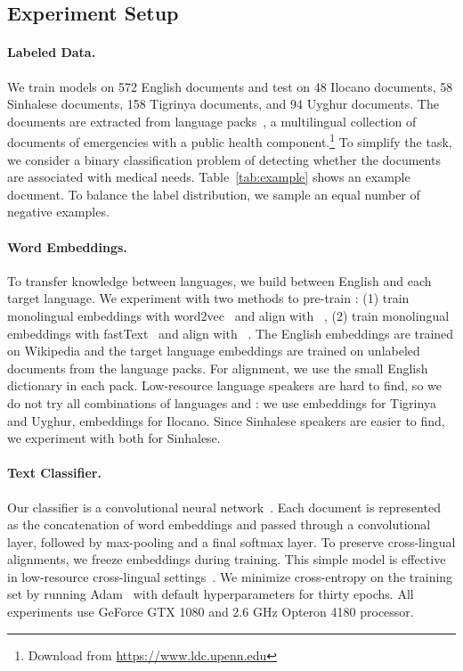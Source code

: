 \subsection{Experiment Setup}

\paragraph{Labeled Data.}
We train models on 572 English documents and test on 48 Ilocano documents, 58
Sinhalese documents, 158 Tigrinya documents, and 94 Uyghur documents.
The documents are extracted from  language
packs~\citep{strassel-16}, a multilingual collection of documents of emergencies with a public health component.\footnote{Download from \url{https://www.ldc.upenn.edu}}
To simplify the task, we consider a binary classification problem of detecting
whether the documents are
associated with medical needs.
Table~\ref{tab:example} shows an example document.
To balance the label distribution, we sample an equal number of negative
examples.

\paragraph{Word Embeddings.}
To transfer knowledge between languages, we build  between English
and each target language.
We experiment with two methods to pre-train : (1) train monolingual
embeddings with word2vec~\citep{mikolov-13-fixed} and align with
~\citep{faruqui-15,ammar-16}, (2) train monolingual embeddings with
fastText~\citep{bojanowski-17} and align with ~\cite{joulin-18}.
The English embeddings are trained on Wikipedia and the target language embeddings
are trained on unlabeled documents from the  language packs.
For alignment, we use the small English dictionary in each pack.
Low-resource language speakers are hard to find, so we do not
try all combinations of languages and :
we use  embeddings for Tigrinya and Uyghur, 
embeddings for Ilocano.
Since Sinhalese speakers are easier to find, we experiment with both 
for Sinhalese.

\paragraph{Text Classifier.}
Our classifier is a convolutional neural network~\citep{kim-14}.
Each document is represented as the concatenation of word embeddings and passed
through a convolutional layer, followed by max-pooling and a final softmax
layer.
To preserve cross-lingual alignments, we freeze embeddings during training.
This simple model is effective in low-resource cross-lingual
settings~\citep{chen-18,schwenk-18}.
We minimize cross-entropy on the training set by running Adam~\citep{kingma-15}
with default hyperparameters for thirty epochs.  All experiments use GeForce GTX 1080
 and 2.6 GHz  Opteron 4180 processor.

